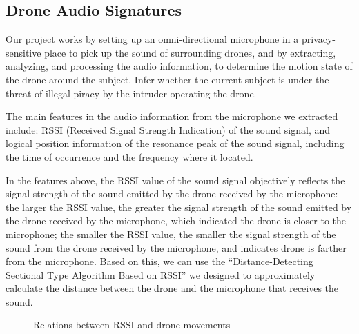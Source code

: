 \documentclass{sig-alternate-10pt}
\begin{document}
\subsection{Drone Audio Signatures}
Our project works by setting up an omni-directional microphone in a privacy-sensitive place to pick up the sound of surrounding drones, and by extracting, analyzing, and processing the audio information, to determine the motion state of the drone around the subject. Infer whether the current subject is under the threat of illegal piracy by the intruder operating the drone.

The main features in the audio information from the microphone we extracted include: RSSI (Received Signal Strength Indication) of the sound signal, and logical position information of the resonance peak of the sound signal, including the time of occurrence and the frequency where it located.

In the features above, the RSSI value of the sound signal objectively reflects the signal strength of the sound emitted by the drone received by the microphone: the larger the RSSI value, the greater the signal strength of the sound emitted by the drone received by the microphone, which indicated the drone is closer to the microphone; the smaller the RSSI value, the smaller the signal strength of the sound from the drone received by the microphone, and indicates drone is farther from the microphone. Based on this, we can use the “Distance-Detecting Sectional Type Algorithm Based on RSSI” we designed to approximately calculate the distance between the drone and the microphone that receives the sound. 

\begin{figure}[!t]
	\centering
	\caption{Relations between RSSI and drone movements}
	\label{formants}
\end{figure}
\end{document}
